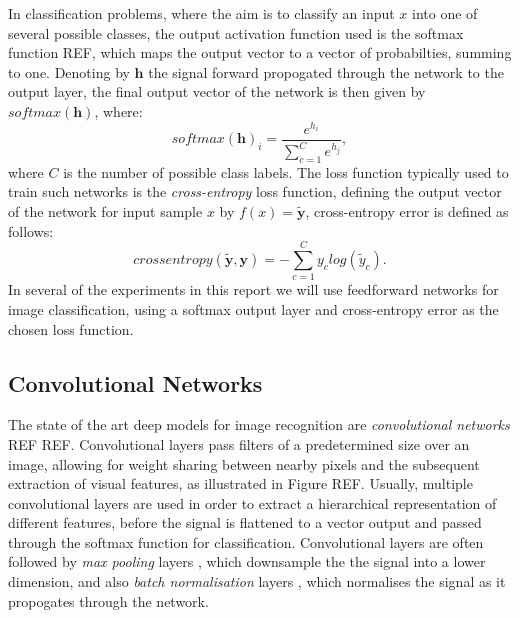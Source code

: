 In classification problems, where the aim is to classify an input $x$ into one of several possible classes, the output activation function used is the softmax function REF, which maps the output vector to a vector of probabilties, summing to one. Denoting by $\mathbf{h}$ the signal forward propogated through the network to the output layer, the final output vector of the network is then given by $softmax(\mathbf{h})$, where:
\begin{equation}
softmax(\mathbf{h})_i = \frac{e^{h_i}}{\sum_{c=1}^Ce^{h_j}},
\end{equation}
where $C$ is the number of possible class labels. The loss function typically used to train such networks is the \textit{cross-entropy} loss function, defining the output vector of the network for input sample $x$ by $f(x) = \tilde{\mathbf{y}}$, cross-entropy error is defined as follows:
\begin{equation}
cross entropy(\tilde{\mathbf{y}},\mathbf{y}) = - \sum_{c=1}^{C} y_{c} log(\tilde{y}_{c}).
\end{equation}
In several of the experiments in this report we will use feedforward networks for image classification, using a softmax output layer and cross-entropy error as the chosen loss function. 

\subsection{Convolutional Networks}\label{sec:convnets}
The state of the art deep models for image recognition are \textit{convolutional networks} REF REF. Convolutional layers pass filters of a predetermined size over an image, allowing for weight sharing between nearby pixels and the subsequent extraction of visual features, as illustrated in Figure REF. Usually, multiple convolutional layers are used in order to extract a hierarchical representation of different features, before the signal is flattened to a vector output and passed through the softmax function for classification. Convolutional layers are often followed by \textit{max pooling} layers \cite{nagi2011max,}, which downsample the the signal into a lower dimension, and also \textit{batch normalisation} layers \cite{ioffe2015batch}, which normalises the signal as it propogates through the network. 

